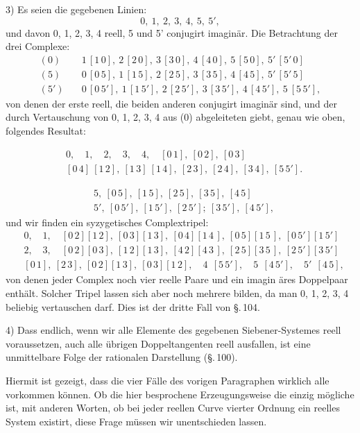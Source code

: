 
3) Es seien die gegebenen Linien:
\[
0,\ 1,\ 2,\ 3,\ 4,\ 5,\ 5',
\]
und davon 0, 1, 2, 3, 4 reell, 5 und 5' conjugirt imagin\"ar. Die
Betrachtung der drei Complexe:
\[
\begin{aligned}
(0)\quad & 1\,[1\,0],\ 2\,[2\,0],\ 3\,[3\,0],\ 4\,[4\,0],\ 5\,[5\,0],\ 5'\,[5'\,0] \\
(5)\quad & 0\,[0\,5],\ 1\,[1\,5],\ 2\,[2\,5],\ 3\,[3\,5],\ 4\,[4\,5],\ 5'\,[5'\,5] \\
(5')\quad & 0\,[0\,5'],\ 1\,[1\,5'],\ 2\,[2\,5'],\ 3\,[3\,5'],\ 4\,[4\,5'],\ 5\ [5\,5'],
\end{aligned}
\]
von denen der erste reell, die beiden anderen conjugirt imagin\"ar
sind, und der durch Vertauschung von 0, 1, 2, 3, 4 aus (0) abgeleiteten
 giebt, genau wie oben, folgendes Resultat:

\begin{center}
\end{center}
\[
\begin{aligned}
&0,\quad 1,\quad 2,\quad 3,\quad 4,\quad [0\,1],\ [0\,2],\ [0\,3] \\
&[0\,4]\ [1\,2],\ [1\,3]\ [1\,4],\ [2\,3],\ [2\,4],\ [3\,4],\ [5\,5'].
\end{aligned}
\]

\begin{center}
\end{center}
\[
\begin{aligned}
&5,\ [0\,5],\ [1\,5],\ [2\,5],\ [3\,5],\ [4\,5] \\
&5',\ [0\,5'],\ [1\,5'],\ [2\,5'];\ [3\,5'],\ [4\,5'], %
\end{aligned}
\]
und wir finden ein syzygetisches Complextripel:
\[
\begin{aligned}
&0,\quad 1,\quad [0\,2][1\,2],\ [0\,3][1\,3],\ [0\,4][1\,4\,],\ [0\,5][1\,5\,],\ [0\,5'][1\,5'] \\
&2,\quad 3,\quad [0\,2][0\,3],\ [1\,2][1\,3],\ [4\,2][4\,3\,],\ [2\,5][3\,5\,],\ [2\,5'][3\,5'] \\
&[0\,1],\ [2\,3],\ [0\,2][1\,3],\ [0\,3][1\,2],\quad 4\ \ [5\,5'],\quad 5\ \ [4\,5'],\quad 5'\ \ [4\,5],
\end{aligned}
\]
von denen jeder Complex noch vier reelle Paare und ein imagin
\"ares Doppelpaar enth\"alt. Solcher Tripel lassen sich aber noch
mehrere bilden, da man 0, 1, 2, 3, 4 beliebig vertauschen darf.
Dies ist der dritte Fall von \S.\,104.

4) Dass endlich, wenn wir alle Elemente des gegebenen
Siebener-Systemes reell voraussetzen, auch alle \"ubrigen Doppeltangenten
 reell ausfallen, ist eine unmittelbare Folge der rationalen
 Darstellung (\S.\,100).

Hiermit ist gezeigt, dass die vier F\"alle des vorigen Paragraphen
 wirklich alle vorkommen k\"onnen. Ob die hier besprochene
 Erzeugungsweise die einzig m\"ogliche ist, mit anderen
Worten, ob bei jeder reellen Curve vierter Ordnung ein reelles
 System existirt, diese Frage m\"ussen wir unentschieden
 lassen.
